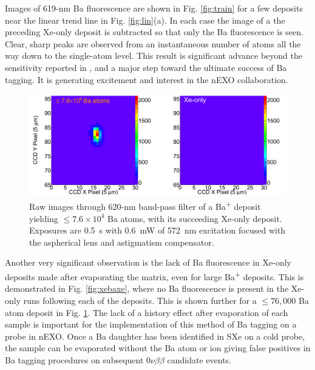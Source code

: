 Images of 619-nm Ba fluorescence are shown in Fig. \ref{fig:train} for a few deposits near the linear trend line in Fig. \ref{fig:lin}(a).  In each case the image of a the preceding Xe-only deposit is subtracted so that only the Ba fluorescence is seen.  Clear, sharp peaks are observed from an instantaneous number of atoms all the way down to the single-atom level.  This result is significant advance beyond the sensitivity reported in \cite{Mong2015}, and a major step toward the ultimate success of Ba tagging.  It is generating excitement and interest in the nEXO collaboration.


\begin{figure} %
        \centering
                \includegraphics[width=.95\textwidth]{figures/xebaxe_largest_instantaneous.png}
                \caption{Raw images through 620-nm band-pass filter of a Ba\textsuperscript{+} deposit yielding $\leq 7.6 \times 10^{4}$ Ba atoms, with its succeeding Xe-only deposit.  Exposures are 0.5~s with 0.6~mW of 572~nm excitation focused with the aspherical lens and astigmatism compensator.}
\label{fig:xebaxeLarger}
\end{figure}

Another very significant observation is the lack of Ba fluorescence in Xe-only deposits made after evaporating the matrix, even for large Ba\textsuperscript{+} deposits.  This is demonstrated in Fig. \ref{fig:xebaxe}, where no Ba fluorescence is present in the Xe-only runs following each of the deposits.  This is shown further for a $\leq 76,000$ Ba atom deposit in Fig. \ref{fig:xebaxeLarger}.  The lack of a history effect after evaporation of each sample is important for the implementation of this method of Ba tagging on a probe in nEXO.  Once a Ba daughter has been identified in SXe on a cold probe, the sample can be evaporated without the Ba atom or ion giving false positives in Ba tagging procedures on subsequent $0\nu\beta\beta$ candidate events.

